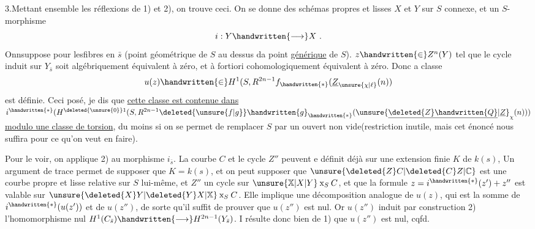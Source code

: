 3.\quad Mettant ensemble les réflexions de 1) et 2), on trouve ceci. On se donne des schémas propres et lisses $X$ et $Y$ sur $S$  connexe, et un $S$-morphisme
\[
i:Y\handwritten{\longrightarrow}X\ .
\]
Onnsuppose   pour lesfibres en $\bar s$ (point géométrique  de $S$ au dessus da point \uline{générique} de $S$).    $z\handwritten{\in}Z^n(Y)$ tel que le cycle induit sur $Y_{\bar s}$ soit algébriquement équivalent à zéro, et à fortiori cohomologiquement équivalent à zéro. Donc a classe
\[
u(z)\handwritten{\in}H^1(S,R^{2n-1}f_{\handwritten{*}}(\underline{Z}_{\unsure{\chi|\ell}}(n))
\]
est définie. Ceci posé, je dis que \uline{cette classe est  contenue dans} $i^{\handwritten{*}}(H^{\deleted{\unsure{0}}1}(S,R^{2n-1}\deleted{\unsure{f|g}}\handwritten{g}_{\handwritten{*}}(\unsure{\underline{\deleted{Z}\handwritten{Q}}|\underline{Z}}_{\chi}(n)))$ \uline{modulo une classe de torsion}, du moins si on    se permet de remplacer $S$ par un ouvert non vide(restriction  inutile, mais cet énoncé nous suffira pour ce qu'on veut en faire).

Pour le voir, on applique 2) au morphisme $i_{\bar s}$. La courbe $C$ et le cycle $Z''$ peuvent e définit déjà sur une extension finie $K$ de $k(s)$, Un argument de trace permet de supposer que $K=k(s)$, et  on peut supposer que $\unsure{\deleted{Z}C|\deleted{C}Z|\mathbb{C}}$  est une courbe propre et lisse relative sur $S$ lui-même, et $Z''$ un cycle sur $\unsure{\mathbb{X}|X|Y}\mathbin{\mathrm{x}}_S C$,  et que la formule $z=i^{\handwritten{*}}(z')+z''$ est valable sur $\unsure{\deleted{X}Y|\deleted{Y}X|\mathbb{X}}\mathbin{\mathrm{x}}_S C$. Elle implique une décomposition analogue de $u(z)$, qui est la somme de $i^{\handwritten{*}}(u(z'))$ et de $u(z'')$, de sorte qu'il suffit de prouver que $u(z'')$ est nul. Or $u(z'')$ induit par construction 2) l'homomorphisme nul $H^1(C_{\bar s})\handwritten{\longrightarrow}H^{2n-1}(Y_{\bar s})$. I résulte donc bien de 1) que $u(z'')$ est nul, cqfd.

